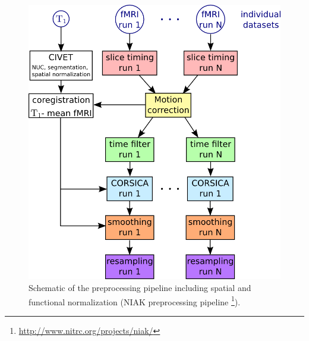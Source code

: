 \begin{figure}[H]
\begin{center}
\includegraphics[scale=0.7]{../figures/fig_flowchart_fmri_preprocess.png}
\end{center}
\caption[Schematic of the preprocessing]
{Schematic of the preprocessing pipeline including spatial and functional normalization (NIAK preprocessing pipeline \footnote{\url{http://www.nitrc.org/projects/niak/}}).}
\label{fig_preprocessing}
\end{figure}

